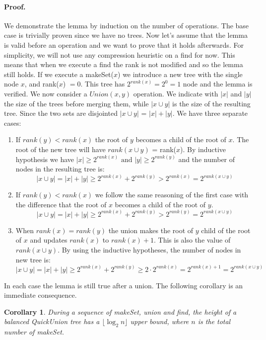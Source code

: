 \documentclass{article}
\newtheorem{corollary}{Corollary}
\begin{document}
\paragraph{\textbf{Proof.}} We demonstrate the lemma by induction on the number of operations. The base case is trivially proven
since we have no trees. Now let's assume that the lemma is valid before an operation and we want to prove that it holds afterwards. For simplicity, we will not use
any compression heuristic on a find for now. This means that when we execute  a find the rank is not modified and so the lemma still holds.
If we execute a makeSet($x$) we introduce a new tree with the single node $x$, and rank($x$) $ = 0$.
This tree has $2^{rank(x)} = 2^0 = 1$ node  and the lemma is verified. We now consider a $Union(x, y)$ operation.
We indicate with $|x|$ and $|y|$ the size of the trees before merging them, while $|x \cup y|$ is the size of the resulting tree. Since the two sets are disjointed
$|x \cup y|$ = $|x| + |y|$.
We have three separate cases:\begin{enumerate}
    \item If $rank(y) < rank(x)$ the root of $y$ becomes a child of the root of $x$. The root of the new tree will have $rank(x \cup y)$ = rank($x$). 
    By inductive hypothesis we have $|x| \geq 2^{rank(x)}\text{ and }|y| \geq 2^{rank(y)}$ and the number
    of nodes in the resulting tree is:
    $$ |x\cup y| = |x| + |y| \geq 2^{rank(x)} + 2^{rank(y)} > 2^{rank(x)} = 2^{rank(x \cup y)} $$
    \item If $rank(y) < rank(x)$ we follow the same reasoning of the first case with the difference that
    the root of $x$ becomes a child of the root of $y$.
    $$ |x\cup y| = |x| + |y| \geq 2^{rank(x)} + 2^{rank(y)} > 2^{rank(y)} = 2^{rank(x \cup y)} $$
    \item When $rank(x) = rank(y)$ the union makes the root of $y$ child of the root of $x$ and updates $rank(x)$ to $rank(x) + 1$. This is also the value of $rank(x\cup y)$.
    By using the inductive hypotheses, the number of nodes in new tree is:
    $$  |x\cup y| = |x| + |y| \geq 2^{rank(x)} + 2^{rank(y)} \geq 2\cdot2^{rank(x)} = 2^{rank(x) + 1} = 2^{rank(x \cup y)} $$
\end{enumerate}
In each case the lemma is still true after a union. The following corollary is an immediate consequence.
\begin{corollary}
    During a sequence of makeSet, union and find, the height of a balanced QuickUnion tree has a $\lfloor \log_2 n \rfloor$ upper bound, where $n$
    is the total number of makeSet.
\end{corollary}
\end{document}
